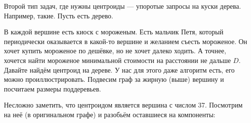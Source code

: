 \documentclass{article}
\begin{document}
    Второй тип задач, где нужны центроиды --- упоротые запросы на куски дерева. Например, такие. Пусть есть дерево.
    \begin{figure}[H]
        
    \end{figure}\noindent
    В каждой вершине есть киоск с мороженым. Есть мальчик Петя, который периодически оказывается в какой-то вершине и желанием съесть мороженое. Он хочет купить мороженое по дешёвке, но не хочет далеко ходить. А точнее, хочется найти мороженое минимальной стоимости на расстоянии не дальше $D$. Давайте найдём центроид на дереве. У нас для этого даже алгоритм есть, его можно проиллюстрировать. Подвесим граф за жирную (выше) вершину и посчитаем размеры поддеревьев.
    \begin{figure}[H]
    \end{figure}\noindent
    Несложно заметить, что центроидом является вершина с числом 37. Посмотрим на неё (в оригинальном графе) и разобьём оставшиеся на компоненты:
    \begin{figure}[H]
        
    \end{figure}\noindent
\end{document}
